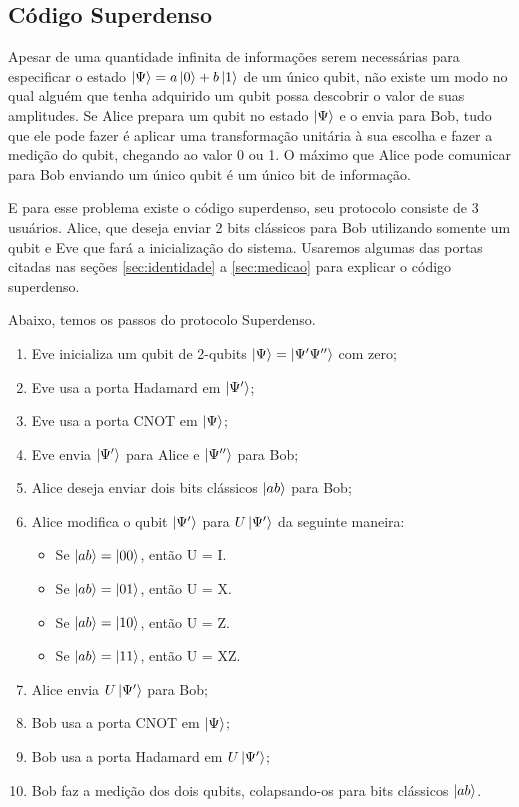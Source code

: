 \documentclass[a4paper, 12pt, oneside]{book}
\begin{document}
\subsection{Código Superdenso} \label{sec:superdenso}

Apesar de uma quantidade infinita de informações serem necessárias para especificar o estado $\ket{\Psi}=a\ket{0}+b\ket{1}$ de um único qubit, não existe um modo no qual alguém que tenha adquirido um qubit possa descobrir o valor de suas amplitudes. Se Alice prepara um qubit no estado $\ket{\Psi}$ e o envia para Bob, tudo que ele pode fazer é aplicar uma transformação unitária à sua escolha e fazer a medição do qubit, chegando ao valor 0 ou 1. O máximo que Alice pode comunicar para Bob enviando um único qubit é um único bit de informação.

E para esse problema existe o código superdenso, seu protocolo consiste de 3 usuários. Alice, que deseja enviar 2 bits clássicos para Bob utilizando somente um qubit e Eve que fará a inicialização do sistema. Usaremos algumas das portas citadas nas seções \ref{sec:identidade} a \ref{sec:medicao} para explicar o código superdenso.

Abaixo, temos os passos do protocolo Superdenso.
\begin{enumerate}
\item Eve inicializa um qubit de 2-qubits $\ket{\Psi} = \ket{\Psi'\Psi''}$ com zero;
\item Eve usa a porta Hadamard em $\ket{\Psi'}$;
\item Eve usa a porta CNOT em $\ket{\Psi}$;
\item Eve envia $\ket{\Psi'}$ para Alice e $\ket{\Psi''}$ para Bob;
\item Alice deseja enviar dois bits clássicos $\ket{ab}$ para Bob;
\item Alice modifica o qubit $\ket{\Psi'}$ para $U\ket{\Psi'}$ da seguinte maneira:
	\begin{itemize}
	\item Se $\ket{ab}=\ket{00}$, então U = I.
	\item Se $\ket{ab}=\ket{01}$, então U = X.
	\item Se $\ket{ab}=\ket{10}$, então U = Z.
	\item Se $\ket{ab}=\ket{11}$, então U = XZ.
	\end{itemize}
\item Alice envia $U\ket{\Psi'}$ para Bob;
\item Bob usa a porta CNOT em $\ket{\Psi}$;
\item Bob usa a porta Hadamard em $U\ket{\Psi'}$;
\item Bob faz a medição dos dois qubits, colapsando-os para bits clássicos $\ket{ab}$.
\end{enumerate}
\end{document}
